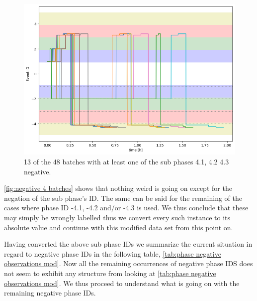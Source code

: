 \documentclass[../Thesis.tex]{subfiles}
\begin{document}
\begin{figure}
    \centering
    \includegraphics[width=.85\linewidth]{figures/Multiple cycles data/Adding of solids/sample negative sub 4 phases.png}
    \caption{13 of the 48 batches with at least one of the sub phases 4.1, 4.2 4.3 negative.}
    \label{fig:negative 4 batches}
\end{figure}

\autoref{fig:negative 4 batches} shows that nothing weird is going on except for the negation of the sub phase's ID. The same can be said for the remaining of the cases where phase ID -4.1, -4.2 and/or -4.3 is used. We thus conclude that these may simply be wrongly labelled thus we convert every such instance to its absolute value and continue with this modified data set from this point on.

Having converted the above sub phase IDs we summarize the current situation in regard to negative phase IDs in the following table, \autoref{tab:phase negative observations mod}. Now all the remaining occurrences of negative phase IDS does not seem to exhibit any structure from looking at \autoref{tab:phase negative observations mod}. We thus proceed to understand what is going on with the remaining negative phase IDs.
\end{document}
